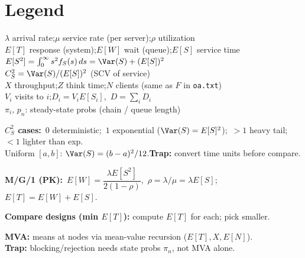 \section*{Legend}
$\lambda$ arrival rate;\quad $\mu$ service rate (per server);\quad $\rho$ utilization\\
$E[T]$ response (system);\quad $E[W]$ wait (queue);\quad $E[S]$ service time\\
$E[S^2]=\int_0^\infty s^2 f_S(s)\,ds=\Var(S)+(E[S])^2$\\
$C_S^2=\Var(S)/(E[S])^2$ (SCV of service)\\
$X$ throughput;\quad $Z$ think time;\quad $N$ clients (same as $F$ in \texttt{oa.txt})\\
$V_i$ visits to $i$;\quad $D_i=V_i E[S_i]$,\ $D=\sum_i D_i$\\
$\pi_i$, $p_n$: steady-state probs (chain / queue length)

\textbf{$C_S^2$ cases:}\ $0$ deterministic;\ $1$ exponential ($\Var(S)=E[S]^2$);\ $>1$ heavy tail;\ $<1$ lighter than exp.\\
Uniform $[a,b]$: $\Var(S)=(b-a)^2/12$.\quad \textbf{Trap:} convert time units before compare.

\textbf{M/G/1 (PK):}\ $E[W]=\dfrac{\lambda E[S^2]}{2(1-\rho)}$,\ $\rho=\lambda/\mu=\lambda E[S]$;\quad $E[T]=E[W]+E[S]$.

\textbf{Compare designs (min $E[T]$):} compute $E[T]$ for each; pick smaller.

\textbf{MVA:} means at nodes via mean-value recursion ($E[T],X,E[N]$).\\
\textbf{Trap:} blocking/rejection needs state probs $\pi_n$, not MVA alone.
